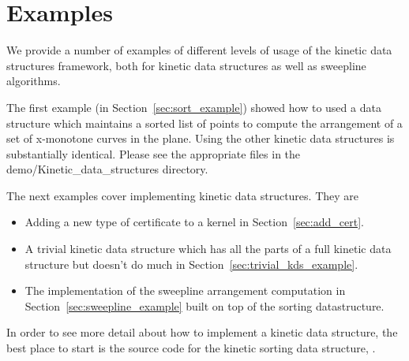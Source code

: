 \section{Examples}
\label{sec:examples}

We provide a number of examples of different levels of usage of the
kinetic data structures framework, both for kinetic data structures as
well as sweepline algorithms.

The first example (in Section~\ref{sec:sort_example}) showed
how to used a data structure which maintains a sorted list of points
to compute the arrangement of a set of x-monotone curves in the
plane. Using the other kinetic data structures is substantially
identical. Please see the appropriate files in the
demo/Kinetic\_data\_structures directory.

The next examples cover implementing kinetic data structures. They are
\begin{itemize}
\item Adding a new type of certificate to a kernel in
  Section~\ref{sec:add_cert}.
\item A trivial kinetic data structure which has all the parts of a
full kinetic data structure but doesn't do much in
Section~\ref{sec:trivial_kds_example}.
\item The implementation of the sweepline arrangement computation in
  Section~\ref{sec:sweepline_example} built on top of the sorting
  datastructure.
\end{itemize}

In order to see more detail about how to implement a kinetic data
structure, the best place to start is the source code for the kinetic
sorting data structure, .





